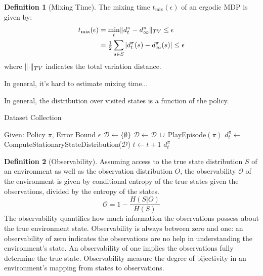 \documentclass{article} %
\DeclarePairedDelimiter{\norm}{\lVert}{\rVert}
\theoremstyle{definition}
\newtheorem{definition}{Definition}[section]
\begin{document}
\begin{definition}[Mixing Time]
\label{def:ssd}
The mixing time $t_{\mathrm{mix}}(\epsilon)$ of an ergodic MDP is given by:
\begin{align*}
t_{\mathrm{mix}}(\epsilon) & = \min_t \norm{d^\pi_t - d^\pi_\infty}_{TV} \le \epsilon \\
& = \tfrac{1}{2}\sum_{s \in S} |d^\pi_t(s) - d^\pi_\infty(s) | \le \epsilon
\end{align*}
where $\norm{\cdot}_{TV}$ indicates the total variation distance.
\end{definition}

In general, it's hard to estimate mixing time...

In general, the distribution over visited states is a function of the
policy.



\begin{algorithm}
\caption{Dataset Collection}
\label{ram-ent}
\begin{algorithmic}
\State Given: Policy $\pi$, Error Bound $\epsilon$
\State $\mathcal{D} \gets \{\emptyset\}$ 
\Do
\State $\mathcal{D} \gets \mathcal{D}\ \cup \ $PlayEpisode$(\pi)$
\State $d^\pi_t \gets \ $ComputeStationaryStateDistribution($\mathcal{D}$)
\State $t\gets t+1$
 
\State \Return $d^\pi_t$
\end{algorithmic}
\end{algorithm}

\begin{definition}[Observability]
Assuming access to the true state distribution $S$ of an environment
as well as the observation distribution $O$, the observability
$\mathcal{O}$ of the environment is given by conditional entropy of
the true states given the observations, divided by the entropy of the
states.
\[
\mathcal{O} = 1 - \frac{H(S|O)}{H(S)}
\]
The observability quantifies how much information the observations
possess about the true environment state. Observability is always
between zero and one: an observability of zero indicates the
observations are no help in understanding the environment's state. An
observability of one implies the observations fully determine the true
state. Observability measure the degree of bijectivity in an
environment's mapping from states to observations.
\end{definition}
\end{document}
